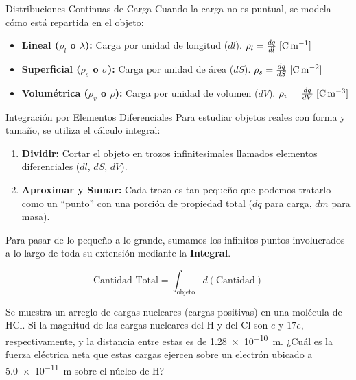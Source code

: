 \documentclass[11pt]{article}
\begin{document}
\begin{boxTeoria}{Distribuciones Continuas de Carga}
    Cuando la carga no es puntual, se modela cómo está repartida en el objeto:
    \begin{itemize}
        \item \textbf{Lineal ($\rho_l$ o $\lambda$):} Carga por unidad de longitud ($dl$). $\rho_l = \frac{dq}{dl} \; [\unit{\C\per\m}]$
        \item \textbf{Superficial ($\rho_s$ o $\sigma$):} Carga por unidad de área ($dS$). $\rho_s = \frac{dq}{dS} \; [\unit{\C\per\m\squared}]$
        \item \textbf{Volumétrica ($\rho_v$ o $\rho$):} Carga por unidad de volumen ($dV$). $\rho_v = \frac{dq}{dV} \; [\unit{\C\per\m\cubed}]$
    \end{itemize}
\end{boxTeoria}

\begin{boxTeoria}{Integración por Elementos Diferenciales}
    Para estudiar objetos reales con forma y tamaño, se utiliza el cálculo integral:
    \begin{enumerate}
        \item \textbf{Dividir:} Cortar el objeto en trozos infinitesimales llamados elementos diferenciales ($dl$, $dS$, $dV$).
        \item \textbf{Aproximar y Sumar:} Cada trozo es tan pequeño que podemos tratarlo como un ``punto'' con una porción de propiedad total ($dq$ para carga, $dm$ para masa).
    \end{enumerate}

    Para pasar de lo pequeño a lo grande, sumamos los infinitos puntos involucrados a lo largo de toda su extensión mediante la \textbf{Integral}.

    \begin{equation*}
        \text{Cantidad Total} = \int_\text{objeto}d(\text{Cantidad})
    \end{equation*}

\end{boxTeoria}

\vspace{0.5cm} %

Se muestra un arreglo de cargas nucleares (cargas positivas) en una
molécula de HCl. Si la magnitud de las cargas nucleares del H y del Cl son $e$ y $17e$, respectivamente, y la distancia entre estas es de \qty{1,28e-10}{\m}. ¿Cuál es la fuerza eléctrica neta que estas cargas ejercen sobre un electrón ubicado a \qty{5,0e-11}{\m} sobre el núcleo de H?
\end{document}
